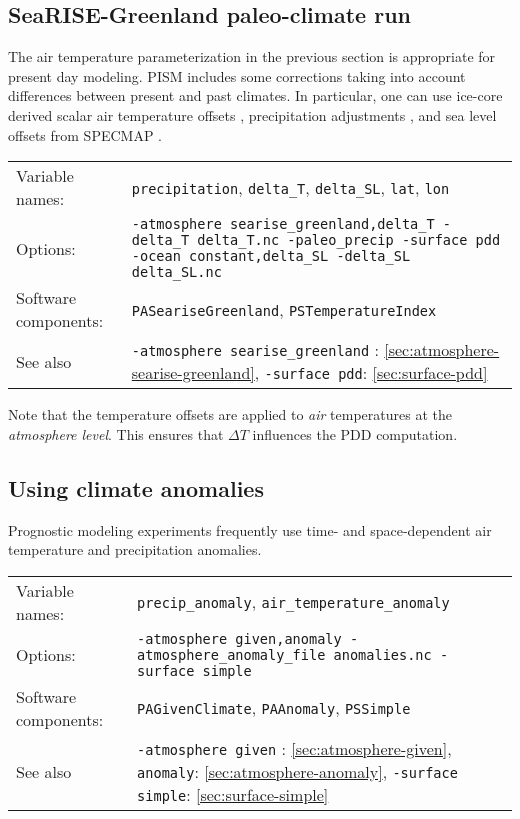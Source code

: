 \documentclass[titlepage,letterpaper,final]{scrartcl}
\def\variable#1{\texttt{#1}\index{NetCDF variables!\texttt{#1}}}
\begin{document}
\subsection{SeaRISE-Greenland paleo-climate run}
\label{sec:use-case-searise-greenland-paleo}

The air temperature parameterization in the previous section is appropriate for
present  day  modeling. PISM  includes  some  corrections  taking into  account
differences  between present  and past  climates.  In particular,  one can  use
ice-core  derived   scalar  air  temperature   offsets  \cite{JohnsenetalGRIP},
precipitation  adjustments  \cite{Huybrechts02},  and  sea level  offsets  from
SPECMAP \cite{Imbrieetal1984}.

\begin{center}
  \begin{tabular}{lp{}}
    \toprule
    Variable names: & \variable{precipitation}, \variable{delta_T}, \variable{delta_SL}, \variable{lat}, \variable{lon}\\
    Options: & \texttt{-atmosphere searise_greenland,delta_T
      \mbox{-delta_T delta_T.nc}
      -paleo_precip  -surface pdd \mbox{-ocean constant,delta_SL}
      -delta_SL delta_SL.nc} \\
    Software components: & \texttt{PASeariseGreenland}, \texttt{PSTemperatureIndex} \\
    See also & \texttt{-atmosphere searise_greenland} : \ref{sec:atmosphere-searise-greenland},
    \texttt{-surface pdd}: \ref{sec:surface-pdd} \\
    \bottomrule
  \end{tabular}
\end{center}

Note that the temperature offsets are applied to \emph{air} temperatures at the
\emph{atmosphere level}. This ensures that $\Delta T$ influences the PDD
computation.

\subsection{Using climate anomalies}
\label{sec:use-case-climate-anomalies}

Prognostic modeling experiments frequently use time- and space-dependent
air temperature and precipitation anomalies.

\begin{center}
  \begin{tabular}{lp{}}
    \toprule
    Variable names: & \variable{precip_anomaly}, \variable{air_temperature_anomaly}\\
    Options:  &  \texttt{-atmosphere given,anomaly  -atmosphere_anomaly_file
      anomalies.nc -surface simple} \\
    Software components: & \texttt{PAGivenClimate}, \texttt{PAAnomaly}, \texttt{PSSimple}\\
    See  also   &  \texttt{-atmosphere  given}   :  \ref{sec:atmosphere-given},
    \texttt{anomaly}: \ref{sec:atmosphere-anomaly}, \texttt{-surface simple}: \ref{sec:surface-simple}\\
    \bottomrule
  \end{tabular}
\end{center}
\end{document}
